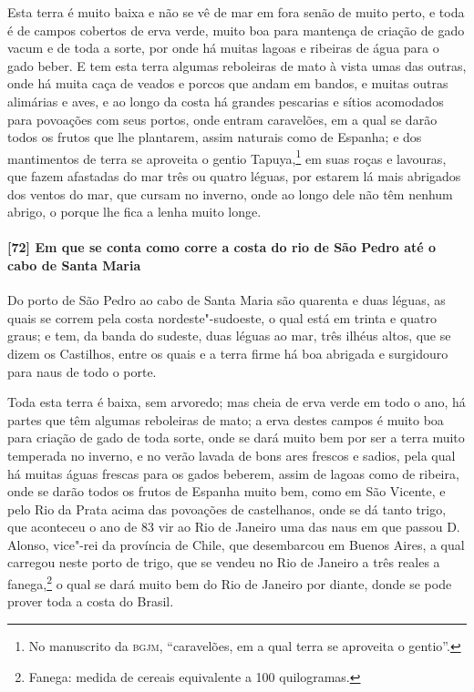 \begin{linenumbers}
Esta terra é muito baixa e não se vê de mar em fora senão de muito perto, e toda é de
campos cobertos de erva verde, muito boa para mantença de criação de gado vacum e de toda
a sorte, por onde há muitas lagoas e ribeiras de água para o gado beber. E tem esta terra
algumas reboleiras de mato à vista umas das outras, onde há muita caça de veados e porcos
que andam em bandos, e muitas outras alimárias e aves, e ao longo da costa há grandes
pescarias e sítios acomodados para povoações com seus portos, onde entram caravelões, em a
qual se darão todos os frutos que lhe plantarem, assim naturais como de Espanha; e dos
mantimentos de terra se aproveita o gentio Tapuya,\footnote{ No manuscrito da
\textsc{bgjm}, ``caravelões, em a qual terra se aproveita o gentio''.} em suas roças e
lavouras, que fazem afastadas do mar três ou quatro léguas, por estarem lá mais abrigados
dos ventos do mar, que cursam no inverno, onde ao longo dele não têm nenhum abrigo, o
porque lhe fica a lenha muito longe.

\paragraph{[72] Em que se conta como corre a costa do rio de São Pedro até o cabo de Santa
Maria} \quad
Do porto de São Pedro ao cabo de Santa Maria são quarenta e duas léguas, as quais se
correm pela costa nordeste"-sudoeste, o qual está em trinta e quatro graus; e tem, da banda
do sudeste, duas léguas ao mar, três ilhéus altos, que se dizem os Castilhos, entre os
quais e a terra firme há boa abrigada e surgidouro para naus de todo o porte.

Toda esta terra é baixa, sem arvoredo; mas cheia de erva verde em todo o ano, há partes
que têm algumas reboleiras de mato; a erva destes campos é muito boa para criação de gado
de toda sorte, onde se dará muito bem por ser a terra muito temperada no inverno, e no
verão lavada de bons ares frescos e sadios, pela qual há muitas águas frescas para os
gados beberem, assim de lagoas como de ribeira, onde se darão todos os frutos de Espanha
muito bem, como em São Vicente, e pelo Rio da Prata acima das povoações de castelhanos,
onde se dá tanto trigo, que aconteceu o ano de 83 vir ao Rio de Janeiro uma das naus em
que passou D. Alonso, vice"-rei da província de Chile, que desembarcou em Buenos Aires, a
qual carregou neste porto de trigo, que se vendeu no Rio de Janeiro a três reales a
fanega,\footnote{ Fanega: medida de cereais equivalente a 100 quilogramas.} o qual se dará
muito bem do Rio de Janeiro por diante, donde se pode prover toda a costa do Brasil.


\end{linenumbers}
